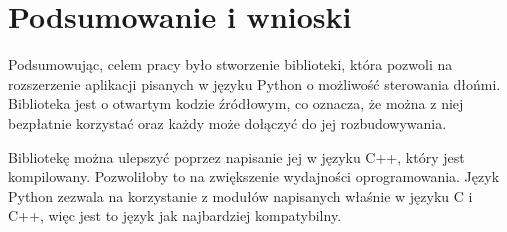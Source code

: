 \chapter{Podsumowanie i wnioski}


\quad Podsumowując, celem pracy było stworzenie biblioteki, która pozwoli na rozszerzenie aplikacji pisanych w języku Python o możliwość sterowania dłońmi. Biblioteka jest o otwartym kodzie źródłowym, co oznacza, że można z niej bezpłatnie korzystać oraz każdy może dołączyć do jej rozbudowywania.  

\quad Bibliotekę można ulepszyć poprzez napisanie jej w języku C++, który jest kompilowany. Pozwoliłoby to na zwiększenie wydajności oprogramowania. Język Python zezwala na korzystanie z modułów napisanych właśnie w języku C i C++, więc jest to język jak najbardziej kompatybilny. 